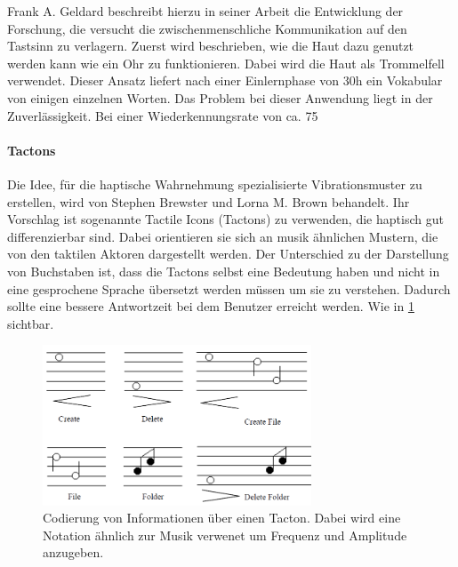 \documentclass{llncs}					%
\begin{document}
Frank A. Geldard \cite{10.2307/1705360} beschreibt hierzu in seiner Arbeit die Entwicklung der Forschung, die versucht die zwischenmenschliche Kommunikation auf den Tastsinn zu verlagern. Zuerst wird beschrieben, wie die Haut dazu genutzt werden kann wie ein Ohr zu funktionieren. Dabei wird die Haut als Trommelfell verwendet. Dieser Ansatz liefert nach einer Einlernphase von 30h ein Vokabular von einigen einzelnen Worten\cite{10.2307/1705360}. Das Problem bei dieser Anwendung liegt in der Zuverlässigkeit. Bei einer Wiederkennungsrate von ca. 75%

\paragraph{Tactons} Die Idee, für die haptische Wahrnehmung spezialisierte Vibrationsmuster zu erstellen, wird von Stephen Brewster und Lorna M. Brown\cite{Brewster:2004:TST:976310.976313} behandelt. Ihr Vorschlag ist sogenannte Tactile Icons (Tactons) zu verwenden, die haptisch gut differenzierbar sind. Dabei orientieren sie sich an musik ähnlichen Mustern, die von den taktilen Aktoren dargestellt werden\cite{Brewster:2004:TST:976310.976313}.
Der Unterschied zu der Darstellung von Buchstaben ist, dass die Tactons selbst eine Bedeutung haben und nicht in eine gesprochene Sprache übersetzt werden müssen um sie zu verstehen. Dadurch sollte eine bessere Antwortzeit bei dem Benutzer erreicht werden. Wie in \ref{7-Tacton-Verwendungsbeispiel} sichtbar.

\begin{figure}[htbp]
	\begin{center}
		\includegraphics[width = 8cm]{Grafiken/7-Tacton-Verwendungsbeispiel.png}
		\caption{Codierung von Informationen über einen Tacton\cite{Brewster:2004:TST:976310.976313}. Dabei wird eine Notation ähnlich zur Musik verwenet um Frequenz und Amplitude anzugeben.}
		\label{7-Tacton-Verwendungsbeispiel}
	\end{center}
\end{figure}
\end{document}
